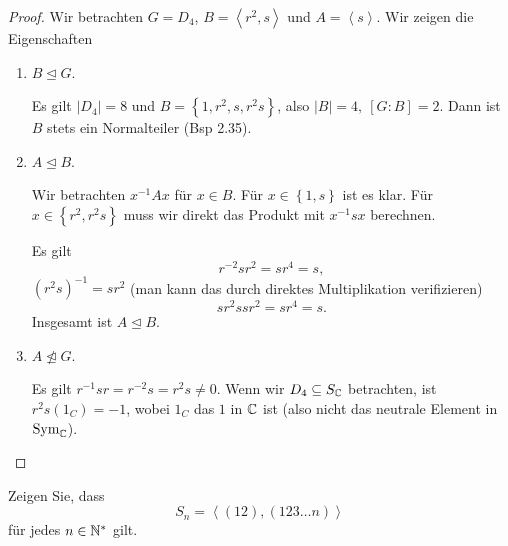 \begin{proof}
	Wir betrachten $G=D_4$, $B=\left<r^2,s \right>$ und $A=\left<s \right>$. Wir zeigen die Eigenschaften
	\begin{enumerate}[label=(\roman*)]
		\item $B\trianglelefteq G$.

			Es gilt $|D_4|=8$ und $B=\left\{ 1,r^2,s,r^2s \right\} $, also $|B|=4,~[G:B]=2$. Dann ist $B$ stets ein Normalteiler (Bsp 2.35).

		\item $A\trianglelefteq B$.

			Wir betrachten $x^{-1}Ax$ f\"{u}r $x\in B$. F\"{u}r $x\in\left\{ 1,s \right\} $ ist es klar. F\"{u}r $x\in \left\{ r^2,r^2s \right\} $ muss wir direkt das Produkt mit $x^{-1}sx$ berechnen.

			Es gilt
			\[
				r^{-2}s r^{2}=s r^4=s
			,\]
			$(r^2s)^{-1}=s r^2$ (man kann das durch direktes Multiplikation verifizieren)
			\[
			s r^2 s s r^2=s r^4=s
			.\]
			Insgesamt ist $A\trianglelefteq B$.
		\item $A\not\trianglelefteq G$. 

			Es gilt $r^{-1} s r=r^{-2} s=r^2s\neq 0$. Wenn wir $D_4\subseteq S_{\mathbb{C}}$ betrachten, ist $r^2s(1_C)=-1$, wobei $1_C$ das $1$ in $\mathbb{C}$ ist (also nicht das neutrale Element in $\text{Sym}_{\mathbb{C}}$).
	\end{enumerate}
\end{proof}
\begin{Problem}
	Zeigen Sie, dass
	\[
	S_n=\left<(12),(123\dots n) \right>\] 
	f\"{u}r jedes $n\in \mathbb{N}^*$ gilt.
\end{Problem}
